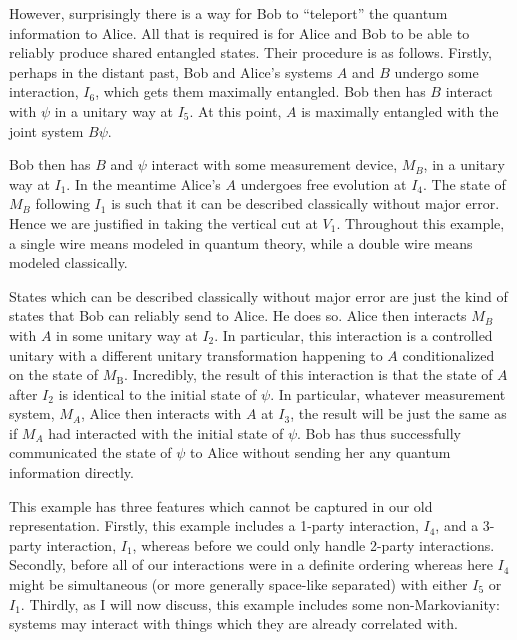 \documentclass[12pt,prd,superscriptaddress,floatfix,amsmath,amssymb,amsfonts,nofootinbib]{revtex4-2}
\begin{document}
However, surprisingly there is a way for Bob to ``teleport'' the quantum information to Alice. All that is required is for Alice and Bob to be able to reliably produce shared entangled states. Their procedure is as follows. Firstly, perhaps in the distant past, Bob and Alice's systems $A$ and $B$ undergo some interaction, $I_6$, which gets them maximally entangled. Bob then has $B$ interact with $\psi$ in a unitary way at $I_5$. At this point, $A$ is maximally entangled with the joint system $B\psi$.

Bob then has $B$ and $\psi$ interact with some measurement device, $M_B$, in a unitary way at $I_1$. In the meantime Alice's $A$ undergoes free evolution at $I_4$. The state of $M_B$ following $I_1$ is such that it can be described classically without major error. Hence we are justified in taking the vertical cut at $V_1$. Throughout this example, a single wire means modeled in quantum theory, while a double wire means modeled classically.

States which can be described classically without major error are just the kind of states that Bob can reliably send to Alice. He does so. Alice then interacts $M_B$ with $A$ in some unitary way at $I_2$. In particular, this interaction is a controlled unitary with a different unitary transformation happening to $A$ conditionalized on the state of $M_\text{B}$. Incredibly, the result of this interaction is that the state of $A$ after $I_2$ is identical to the initial state of $\psi$. In particular, whatever measurement system, $M_A$, Alice then interacts with $A$ at $I_3$, the result will be just the same as if $M_A$ had interacted with the initial state of $\psi$. Bob has thus successfully communicated the state of $\psi$ to Alice without sending her any quantum information directly. %

This example has three features which cannot be captured in our old representation. Firstly, this example includes a 1-party interaction, $I_4$, and a 3-party interaction, $I_1$, whereas before we could only handle 2-party interactions. Secondly, before all of our interactions were in a definite ordering whereas here $I_4$ might be simultaneous (or more generally space-like separated) with either $I_5$ or $I_1$. Thirdly, as I will now discuss, this example includes some non-Markovianity: systems may interact with things which they are already correlated with.
\end{document}
